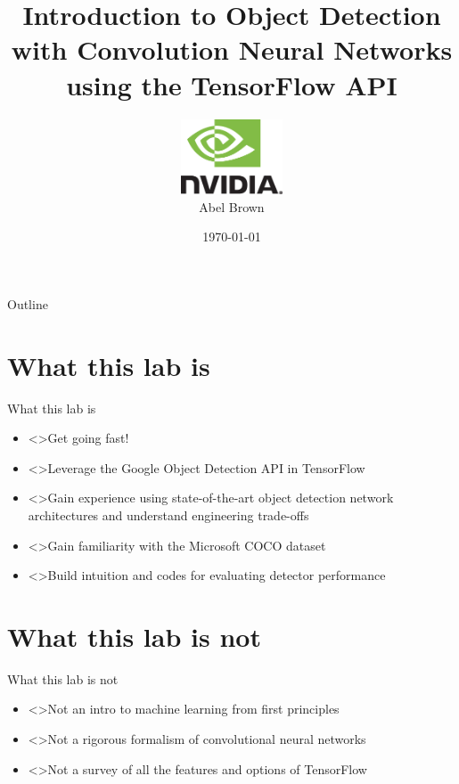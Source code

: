 \documentclass[handout]{beamer}
\title{Introduction to Object Detection with Convolution Neural Networks using the TensorFlow API}
\author{
	\includegraphics[width=3cm]{../../media/logo/NVLogo_2D.eps}
	\vspace{0.75cm}
	\\Abel Brown}
\date{\today}
\begin{document}
\frame{\titlepage}

\begin{frame}{Outline}
\tableofcontents
\end{frame}




\section{What this lab is}
\begin{frame}{What this lab is}
\begin{itemize}
\itemsep 1em
	\item<>Get going fast!  
	\item<>Leverage the Google Object Detection API in TensorFlow
	\item<>Gain experience using state-of-the-art object detection network architectures and understand engineering trade-offs
	\item<>Gain familiarity with the Microsoft COCO dataset
	\item<>Build intuition and codes for evaluating detector performance
\end{itemize}
\end{frame}

\section{What this lab is not}
\begin{frame}{What this lab is not}
\begin{itemize}
\itemsep 1em
	\item<>Not an intro to machine learning from first principles
	\item<>Not a rigorous formalism of convolutional neural networks
	\item<>Not a survey of all the features and options of TensorFlow
\end{itemize}
\end{frame}
\end{document}
